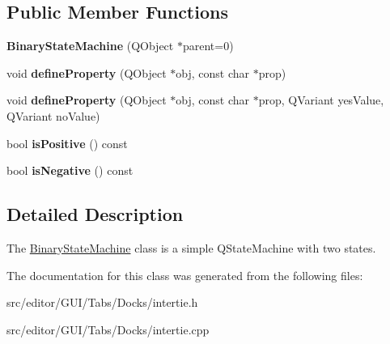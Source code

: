 \subsection*{Public Member Functions}
\begin{DoxyCompactItemize}
\item 
\hypertarget{class_binary_state_machine_a9e022d1bf8c0d7c2c7916c6b329d8891}{}\label{class_binary_state_machine_a9e022d1bf8c0d7c2c7916c6b329d8891} 
{\bfseries Binary\+State\+Machine} (Q\+Object $\ast$parent=0)
\item 
\hypertarget{class_binary_state_machine_a5996c6d83be3422a74e9bf26c30958ca}{}\label{class_binary_state_machine_a5996c6d83be3422a74e9bf26c30958ca} 
void {\bfseries define\+Property} (Q\+Object $\ast$obj, const char $\ast$prop)
\item 
\hypertarget{class_binary_state_machine_a7f9c62ef8512448a2e1afb38f29a7c0f}{}\label{class_binary_state_machine_a7f9c62ef8512448a2e1afb38f29a7c0f} 
void {\bfseries define\+Property} (Q\+Object $\ast$obj, const char $\ast$prop, Q\+Variant yes\+Value, Q\+Variant no\+Value)
\item 
\hypertarget{class_binary_state_machine_ab1279ac5e73d92701a5d0750e23a7048}{}\label{class_binary_state_machine_ab1279ac5e73d92701a5d0750e23a7048} 
bool {\bfseries is\+Positive} () const
\item 
\hypertarget{class_binary_state_machine_a85f770c9351304ec72870970cd7a2e07}{}\label{class_binary_state_machine_a85f770c9351304ec72870970cd7a2e07} 
bool {\bfseries is\+Negative} () const
\end{DoxyCompactItemize}


\subsection{Detailed Description}
The \hyperlink{class_binary_state_machine}{Binary\+State\+Machine} class is a simple Q\+State\+Machine with two states. 

The documentation for this class was generated from the following files\+:\begin{DoxyCompactItemize}
\item 
src/editor/\+G\+U\+I/\+Tabs/\+Docks/intertie.\+h\item 
src/editor/\+G\+U\+I/\+Tabs/\+Docks/intertie.\+cpp\end{DoxyCompactItemize}
